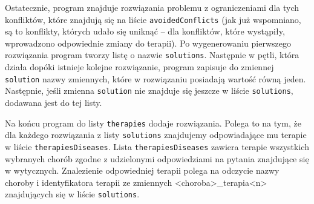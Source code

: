Ostatecznie, program znajduje rozwiązania problemu z ograniczeniami dla tych konfliktów, które znajdują się na liście \texttt{avoidedConflicts} (jak już wspomniano, są to konflikty, których udało się uniknąć -- dla konfliktów, które wystąpiły, wprowadzono odpowiednie zmiany do terapii). Po wygenerowaniu pierwszego rozwiązania program tworzy listę o nazwie \texttt{solutions}. Następnie w pętli, która działa dopóki istnieje kolejne rozwiązanie, program zapisuje do zmiennej \texttt{solution} nazwy zmiennych, które w rozwiązaniu posiadają wartość równą jeden. Następnie, jeśli zmienna \texttt{solution} nie znajduje się jeszcze w liście \texttt{solutions}, dodawana jest do tej listy. 

Na końcu program do listy \texttt{therapies} dodaje rozwiązania. Polega to na tym, że dla każdego rozwiązania z listy \texttt{solutions} znajdujemy odpowiadające mu terapie w liście \texttt{therapiesDiseases}. Lista \texttt{therapiesDiseases} zawiera terapie wszystkich wybranych chorób zgodne z udzielonymi odpowiedziami na pytania znajdujące się w wytycznych. Znalezienie odpowiedniej terapii polega na odczycie nazwy choroby i identyfikatora terapii ze zmiennych <choroba>\_terapia<n> znajdujących się w liście \texttt{solutions}.

